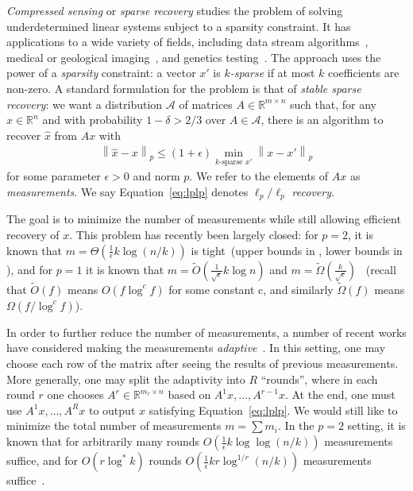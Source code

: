 \documentclass[twoside,leqno,twocolumn]{article}
\newcommand{\norm}[2]{\left \lVert#2\right \rVert_{#1}}
\def\R{\mathbb{R}}
\def\eps{\epsilon}
\begin{document}
\emph{Compressed sensing} or \emph{sparse recovery} studies the
problem of solving underdetermined linear systems subject to a
sparsity constraint.  It has applications to a wide variety of fields,
including data stream algorithms~\cite{M05}, medical or geological
imaging~\cite{CRT06,D06}, and genetics testing~\cite{SAZ}.  The
approach uses the power of a \emph{sparsity} constraint: a vector $x'$
is \emph{$k$-sparse} if at most $k$ coefficients are non-zero.  A
standard formulation for the problem is that of \emph{stable sparse
  recovery}: we want a distribution $\mathcal{A}$ of matrices $A \in
\R^{m \times n}$ such that, for any $x \in \R^n$ and with probability
$1-\delta>2/3$ over $A \in \mathcal{A}$, there is an algorithm to recover
$\hat{x}$ from $Ax$ with
\begin{align}\label{eq:lplp}
  \norm{p}{\hat{x} - x} \leq (1 + \eps) \min_{k\text{-sparse } x'} \norm{p}{x - x'}
\end{align}
for some parameter $\eps > 0$ and norm $p$.  We refer to the elements
of $Ax$ as \emph{measurements}.  We say Equation~\eqref{eq:lplp}
denotes \emph{$\ell_p/\ell_p$ recovery}.

The goal is to minimize the number of measurements while still
allowing efficient recovery of $x$.  This problem has recently been
largely closed: for $p=2$, it is known that $m = \Theta(\frac{1}{\eps}
k \log (n/k))$ is tight~(upper bounds in \cite{CRT06,GLPS}, lower
bounds in \cite{PW11,CD11}), and for $p=1$ it is known that $m =
\widetilde{O}(\frac{1}{\sqrt{\eps}}k\log n)$ and $m =
\widetilde{\Omega}(\frac{k}{\sqrt{\eps}})$~\cite{PW11} (recall that
$\widetilde{O}(f)$ means $O(f \log^c f)$ for some constant c, and
similarly $\widetilde{\Omega}(f)$ means $\Omega(f / \log^c f)$).

In order to further reduce the number of measurements, a number of recent works
have considered making the measurements
\emph{adaptive}~\cite{JXC,CHNR,HCN,HBCN,MSW,AWZ,IPW11}.
In this setting, one may choose each row of the matrix after seeing
the results of previous measurements.  More generally, one may split
the adaptivity into $R$ ``rounds'', where in each round $r$ one
chooses $A^r \in \R^{m_r \times n}$ based on $A^1x, \dotsc, A^{r-1}x$.
At the end, one must use $A^1x, \dotsc, A^Rx$ to output $\hat{x}$
satisfying Equation~\eqref{eq:lplp}.  We would still like to minimize
the total number of measurements $m = \sum m_i$.  In the $p=2$
setting, it is known that for arbitrarily many rounds
$O(\frac{1}{\eps}k \log \log (n/k))$ measurements suffice, and for
$O(r \log^*k)$ rounds $O(\frac{1}{\eps}k r\log^{1/r} (n/k))$
measurements suffice~\cite{IPW11}.  
\end{document}
